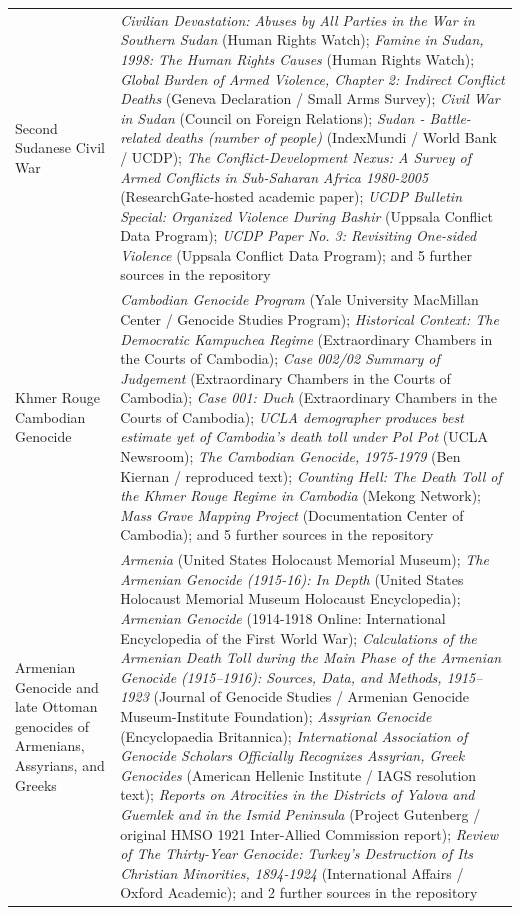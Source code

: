 \documentclass[11pt]{article}
\begin{document}
\begin{scriptsize}
\begin{longtable}{p{3.5cm} p{12.5cm}}
Second Sudanese Civil War & \emph{Civilian Devastation: Abuses by All Parties in the War in Southern Sudan} (Human Rights Watch); \emph{Famine in Sudan, 1998: The Human Rights Causes} (Human Rights Watch); \emph{Global Burden of Armed Violence, Chapter 2: Indirect Conflict Deaths} (Geneva Declaration / Small Arms Survey); \emph{Civil War in Sudan} (Council on Foreign Relations); \emph{Sudan - Battle-related deaths (number of people)} (IndexMundi / World Bank / UCDP); \emph{The Conflict-Development Nexus: A Survey of Armed Conflicts in Sub-Saharan Africa 1980-2005} (ResearchGate-hosted academic paper); \emph{UCDP Bulletin Special: Organized Violence During Bashir} (Uppsala Conflict Data Program); \emph{UCDP Paper No. 3: Revisiting One-sided Violence} (Uppsala Conflict Data Program); and 5 further sources in the repository \\
\addlinespace
Khmer Rouge Cambodian Genocide & \emph{Cambodian Genocide Program} (Yale University MacMillan Center / Genocide Studies Program); \emph{Historical Context: The Democratic Kampuchea Regime} (Extraordinary Chambers in the Courts of Cambodia); \emph{Case 002/02 Summary of Judgement} (Extraordinary Chambers in the Courts of Cambodia); \emph{Case 001: Duch} (Extraordinary Chambers in the Courts of Cambodia); \emph{UCLA demographer produces best estimate yet of Cambodia’s death toll under Pol Pot} (UCLA Newsroom); \emph{The Cambodian Genocide, 1975-1979} (Ben Kiernan / reproduced text); \emph{Counting Hell: The Death Toll of the Khmer Rouge Regime in Cambodia} (Mekong Network); \emph{Mass Grave Mapping Project} (Documentation Center of Cambodia); and 5 further sources in the repository \\
\addlinespace
Armenian Genocide and late Ottoman genocides of Armenians, Assyrians, and Greeks & \emph{Armenia} (United States Holocaust Memorial Museum); \emph{The Armenian Genocide (1915-16): In Depth} (United States Holocaust Memorial Museum Holocaust Encyclopedia); \emph{Armenian Genocide} (1914-1918 Online: International Encyclopedia of the First World War); \emph{Calculations of the Armenian Death Toll during the Main Phase of the Armenian Genocide (1915–1916): Sources, Data, and Methods, 1915–1923} (Journal of Genocide Studies / Armenian Genocide Museum-Institute Foundation); \emph{Assyrian Genocide} (Encyclopaedia Britannica); \emph{International Association of Genocide Scholars Officially Recognizes Assyrian, Greek Genocides} (American Hellenic Institute / IAGS resolution text); \emph{Reports on Atrocities in the Districts of Yalova and Guemlek and in the Ismid Peninsula} (Project Gutenberg / original HMSO 1921 Inter-Allied Commission report); \emph{Review of The Thirty-Year Genocide: Turkey's Destruction of Its Christian Minorities, 1894-1924} (International Affairs / Oxford Academic); and 2 further sources in the repository \\

\end{longtable}
\end{scriptsize}
\end{document}
